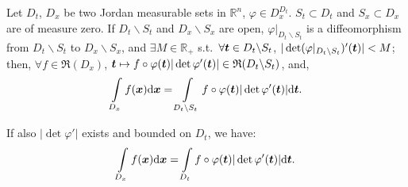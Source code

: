 \documentclass[openany]{book}
\begin{document}
\begin{theorem}
	Let $D_t$, $D_x$ be two Jordan measurable sets in $\mathbb R^n$, $\varphi \in D_x^{D_t}$. 
	$S_t \subset D_t$ and $S_x \subset D_x$ are of measure zero.
	If $D_t \backslash S_t$ and $D_x \backslash S_x$ are open, $\varphi|_{D_t \backslash S_t}$ is a diffeomorphism from $D_t \backslash S_t$ to $D_x \backslash S_x$, and $\exists M \in \mathbb R_+$ s.t.\ $\forall \boldsymbol{t} \in D_t \backslash S_t$, $|\det (\varphi|_{D_t \backslash S_t})'(\boldsymbol{t})| < M$; 
	then, $\forall f \in \mathfrak R(D_x)$, $\boldsymbol{t} \mapsto f \circ \varphi(\boldsymbol{t}) |\det \varphi'(\boldsymbol{t})| \in \mathfrak R(D_t \backslash S_t)$, and, 
	\begin{equation*}
		\int\limits_{D_x} f(\boldsymbol{x}) \mathrm{d} \boldsymbol{x} = \int\limits_{D_t\backslash S_t} f \circ \varphi(\boldsymbol{t}) |\det \varphi'(\boldsymbol{t})| \mathrm{d} \boldsymbol{t}.
	\end{equation*}

	If also $|\det \varphi'|$ exists and bounded on $D_t$, we have:
	\begin{equation*}
		\int\limits_{D_x} f(\boldsymbol{x}) \mathrm{d} \boldsymbol{x} = \int\limits_{D_t} f \circ \varphi(\boldsymbol{t}) |\det \varphi'(\boldsymbol{t})| \mathrm{d} \boldsymbol{t}.
	\end{equation*}
\end{theorem}
\end{document}
